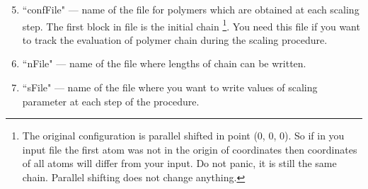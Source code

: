\documentclass[12pt]{article}
\begin{document}
\begin{mySection}
\begin{enumerate}
\setcounter{enumi}{4}
\item ``confFile" --- name of the file for polymers which are obtained at each scaling step. The first block in file is the initial chain \footnote{The original configuration is parallel shifted in point (0, 0, 0). So if in you input file the first atom was not in the origin of coordinates then coordinates of all atoms will differ from your input. Do not panic, it is still the same chain. Parallel shifting does not change anything.}. You need this file if you want to track the evaluation of polymer chain during the scaling procedure. 
\item ``nFile" ---  name of the file where lengths of chain can be written.
\item ``sFile" ---  name of the file where you want to write values of scaling parameter at each step of the procedure.
\end{enumerate}


\end{mySection}
\end{document}
